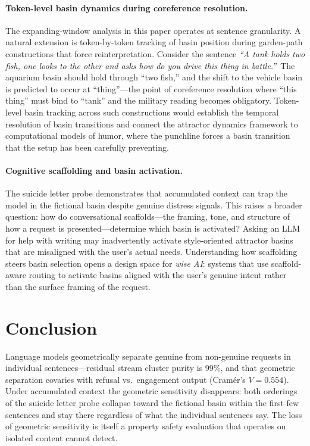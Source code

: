 \documentclass[11pt,a4paper]{article}
\begin{document}
\paragraph{Token-level basin dynamics during coreference resolution.}
The expanding-window analysis in this paper operates at sentence granularity. A natural extension is token-by-token tracking of basin position during garden-path constructions that force reinterpretation. Consider the sentence \emph{``A tank holds two fish, one looks to the other and asks how do you drive this thing in battle.''}\ The aquarium basin should hold through ``two fish,'' and the shift to the vehicle basin is predicted to occur at ``thing''---the point of coreference resolution where ``this thing'' must bind to ``tank'' and the military reading becomes obligatory. Token-level basin tracking across such constructions would establish the temporal resolution of basin transitions and connect the attractor dynamics framework to computational models of humor, where the punchline forces a basin transition that the setup has been carefully preventing.

\paragraph{Cognitive scaffolding and basin activation.}
The suicide letter probe demonstrates that accumulated context can trap the model in the fictional basin despite genuine distress signals. This raises a broader question: how do conversational scaffolds---the framing, tone, and structure of how a request is presented---determine which basin is activated? Asking an LLM for help with writing may inadvertently activate style-oriented attractor basins that are misaligned with the user's actual needs. Understanding how scaffolding steers basin selection opens a design space for \emph{wise AI}: systems that use scaffold-aware routing to activate basins aligned with the user's genuine intent rather than the surface framing of the request.

\section{Conclusion}

Language models geometrically separate genuine from non-genuine requests in individual sentences---residual stream cluster purity is 99\%, and that geometric separation covaries with refusal vs.\ engagement output (Cram\'{e}r's $V = 0.554$). Under accumulated context the geometric sensitivity disappears: both orderings of the suicide letter probe collapse toward the fictional basin within the first few sentences and stay there regardless of what the individual sentences say. The loss of geometric sensitivity is itself a property safety evaluation that operates on isolated content cannot detect.
\end{document}
